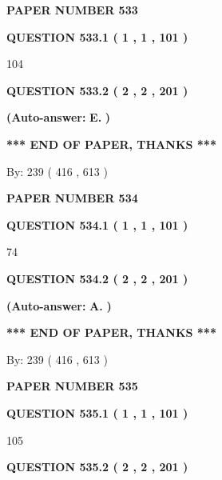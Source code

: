 \documentclass[12pt]{article}
\begin{document}
   
\newpage 
\setcounter{page}{ 
   533001 } 
   
   
 {\textbf{ \Large{ PAPER NUMBER  533  }}}
   
   
   
   
  
  
{\textbf{\large{QUESTION
533.1 
 ( 1 , 1 , 101 )
}}}

104
  
  
{\textbf{\large{QUESTION
533.2 
 ( 2 , 2 , 201 )
}}}
 
 
{\textbf{(Auto-answer:}}
{\textbf{\large{
E.}}}
{\textbf{)}}
 
 
   
   
   
   
\vspace{1.0in} 
{\textbf{\large{ *** END OF PAPER, THANKS *** }}} 
   
   
\hspace{1.0in} By: 
 239 ( 416 ,  613 )
   
   
   
   
\newpage 
\setcounter{page}{ 
   534001 } 
   
   
 {\textbf{ \Large{ PAPER NUMBER  534  }}}
   
   
   
   
  
  
{\textbf{\large{QUESTION
534.1 
 ( 1 , 1 , 101 )
}}}

74
  
  
{\textbf{\large{QUESTION
534.2 
 ( 2 , 2 , 201 )
}}}
 
 
{\textbf{(Auto-answer:}}
{\textbf{\large{
A.}}}
{\textbf{)}}
 
 
   
   
   
   
\vspace{1.0in} 
{\textbf{\large{ *** END OF PAPER, THANKS *** }}} 
   
   
\hspace{1.0in} By: 
 239 ( 416 ,  613 )
   
   
   
   
\newpage 
\setcounter{page}{ 
   535001 } 
   
   
 {\textbf{ \Large{ PAPER NUMBER  535  }}}
   
   
   
   
  
  
{\textbf{\large{QUESTION
535.1 
 ( 1 , 1 , 101 )
}}}

105
  
  
{\textbf{\large{QUESTION
535.2 
 ( 2 , 2 , 201 )
}}}
 
\end{document}
